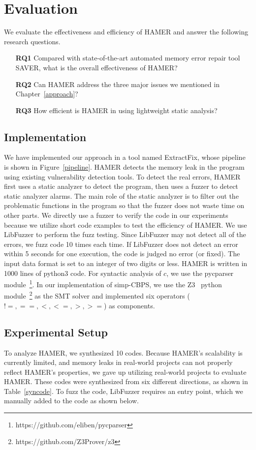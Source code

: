 \documentclass[a4paper,11pt,oneside,openany]{book}
\begin{document}

\chapter{Evaluation}
We evaluate the effectiveness and efficiency of HAMER and answer the following research questions.

\begin{itemize}
\item[\textbf{RQ1}] Compared with state-of-the-art automated memory error repair tool SAVER, what is the overall effectiveness of HAMER?
\item[\textbf{RQ2}] Can HAMER address the three major issues we mentioned in Chapter~\ref{approach}? 
\item[\textbf{RQ3}] How efficient is HAMER in using lightweight static analysis?
\end{itemize}

\section{Implementation}
We have implemented our approach in a tool named ExtractFix, whose pipeline is shown in Figure~\ref{pipeline}. HAMER detects the memory leak in the program using existing vulnerability detection tools. To detect the real errors, HAMER first uses a static analyzer to detect the program, then uses a fuzzer to detect static analyzer alarms. The main role of the static analyzer is to filter out the problematic functions in the program so that the fuzzer does not waste time on other parts. We directly use a fuzzer to verify the code in our experiments because we utilize short code examples to test the efficiency of HAMER. We use LibFuzzer to perform the fuzz testing. Since LibFuzzer may not detect all of the errors, we fuzz code 10 times each time. If LibFuzzer does not detect an error within 5 seconds for one execution, the code is judged no error (or fixed). The input data format is set to an integer of two digits or less. HAMER is written in 1000 lines of python3 code. For syntactic analysis of $c$, we use the pycparser module~\footnote{https://github.com/eliben/pycparser}. In our implementation of simp-CBPS, we use the Z3~\cite{z3} python module~\footnote{https://github.com/Z3Prover/z3} as the SMT solver and implemented six operators ($!=, ==, <, <=, >, >=$) as components. 

\section{Experimental Setup}
To analyze HAMER, we synthesized 10 codes. Because HAMER's scalability is currently limited, and memory leaks in real-world projects can not properly reflect HAMER's properties, we gave up utilizing real-world projects to evaluate HAMER. These codes were synthesized from six different directions, as shown in Table~\ref{syncode}. To fuzz the code, LibFuzzer requires an entry point, which we manually added to the code as shown below. 
\end{document}
